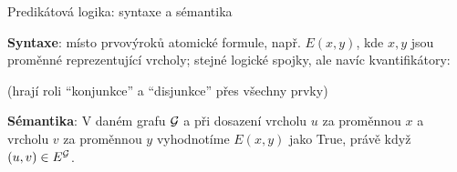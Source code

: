 \documentclass{beamer}
\begin{document}
\begin{frame}{Predikátová logika: syntaxe a sémantika}

    \textbf{Syntaxe}: místo prvovýroků \alert{atomické formule}, např. $E(x,y)$, kde $x,y$ jsou \alert{proměnné} reprezentující vrcholy; stejné logické spojky, ale navíc \alert{kvantifikátory}:
  

    (hrají roli ``konjunkce'' a ``disjunkce'' přes všechny prvky)
    
    \bigskip


    \bigskip

    \textbf{Sémantika}: V daném grafu \(\mathcal{G}\) a při \alert{dosazení} vrcholu \(u\) za proměnnou \(x\) a vrcholu \(v\) za proměnnou \(y\) \alert{vyhodnotíme} \( E(x,y) \) jako \alert{True}, právě když \alert{\( (u,v)\in E^{\mathcal{G}} \)}.
        
\end{frame}
\end{document}
